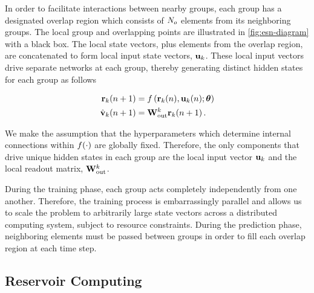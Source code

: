In order to facilitate interactions between nearby groups, each group
has a designated overlap region which consists of $N_{o}$ elements
from its neighboring groups.
The local group and overlapping points are illustrated in \cref{fig:esn-diagram}
with a black box.
The local state vectors, plus elements from the overlap region, are concatenated
to form local input state vectors, $\mathbf{u}_{k}$.
These local input vectors drive separate networks at each group, thereby generating
distinct hidden states for each group as follows
\begin{linenomath*}\begin{equation}
    \begin{aligned}
        \mathbf{r}_{k}(n+1)
        &= f\left(
            \mathbf{r}_{k}(n), \mathbf{u}_{k}(n); \bm{\theta}
        \right) \\
        \hat{\mathbf{v}}_{k}(n+1)
        &= \mathbf{W}_\text{out}^{k} \mathbf{r}_{k}(n+1) \, .
    \end{aligned}
    \label{eq:local-rnn}
\end{equation}\end{linenomath*}
We make the assumption that the hyperparameters which determine internal
connections within $f(\cdot)$ are globally fixed.
Therefore, the only components
that drive unique hidden states in each group are the local input vector
$\mathbf{u}_{k}$ and the local readout matrix, $\mathbf{W}_\text{out}^{k}$.

During the training phase, each group acts completely independently from one
another.
Therefore, the training process is embarrassingly parallel and allows us to
scale the problem to arbitrarily large state vectors across a distributed
computing system, subject to resource constraints.
During the prediction phase, neighboring elements must be passed between
groups in order to fill each overlap region at each time step.


\subsection{Reservoir Computing}
\label{subsec:rc}


